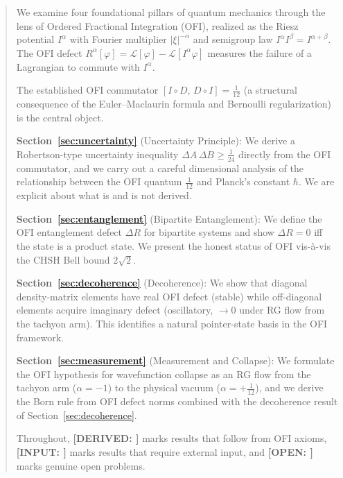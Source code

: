 \documentclass[12pt]{article}
\theoremstyle{definition}
\newcommand{\DERIVED}[1]{\textcolor{derivedcolor}{\textbf{[DERIVED: #1]}}}
\newcommand{\INPUT}[1]{\textcolor{inputcolor}{\textbf{[INPUT: #1]}}}
\newcommand{\OPEN}[1]{\textcolor{opencolor}{\textbf{[OPEN: #1]}}}
\begin{document}
\begin{abstract}
We examine four foundational pillars of quantum mechanics through the lens
of Ordered Fractional Integration (OFI), realized as the Riesz potential
$I^\alpha$ with Fourier multiplier $|\xi|^{-\alpha}$ and semigroup law
$I^\alpha I^\beta = I^{\alpha+\beta}$.  The OFI defect $R^\alpha[\varphi]
= \mathcal{L}[\varphi] - \mathcal{L}[I^\alpha\varphi]$ measures the
failure of a Lagrangian to commute with $I^\alpha$.

The established OFI commutator $[I\circ D,\, D\circ I] = \tfrac{1}{12}$
(a structural consequence of the Euler--Maclaurin formula and Bernoulli
regularization) is the central object.

\textbf{Section~\ref{sec:uncertainty}} (Uncertainty Principle): We derive a
Robertson-type uncertainty inequality $\Delta A\,\Delta B \geq \tfrac{1}{24}$
directly from the OFI commutator, and we carry out a careful dimensional
analysis of the relationship between the OFI quantum $\tfrac{1}{12}$ and
Planck's constant $\hbar$.  We are explicit about what is and is not derived.

\textbf{Section~\ref{sec:entanglement}} (Bipartite Entanglement): We define the
OFI entanglement defect $\Delta R$ for bipartite systems and show $\Delta R = 0$
iff the state is a product state.  We present the honest status of OFI vis-\`{a}-vis
the CHSH Bell bound $2\sqrt{2}$.

\textbf{Section~\ref{sec:decoherence}} (Decoherence): We show that diagonal
density-matrix elements have real OFI defect (stable) while off-diagonal elements
acquire imaginary defect (oscillatory, $\to 0$ under RG flow from the tachyon arm).
This identifies a natural pointer-state basis in the OFI framework.

\textbf{Section~\ref{sec:measurement}} (Measurement and Collapse): We formulate
the OFI hypothesis for wavefunction collapse as an RG flow from the tachyon arm
($\alpha = -1$) to the physical vacuum ($\alpha = +\tfrac{1}{12}$), and we
derive the Born rule from OFI defect norms combined with the decoherence result
of Section~\ref{sec:decoherence}.

Throughout, \DERIVED{} marks results that follow from OFI axioms, \INPUT{} marks
results that require external input, and \OPEN{} marks genuine open problems.
\end{abstract}

\tableofcontents
\newpage

\end{document}
